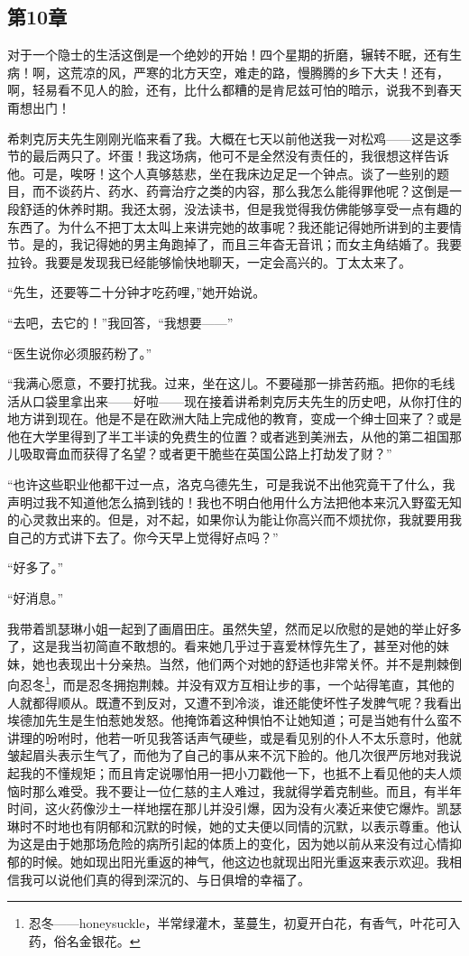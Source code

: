 \subsection{第10章}

\par 对于一个隐士的生活这倒是一个绝妙的开始！四个星期的折磨，辗转不眠，还有生病！啊，这荒凉的风，严寒的北方天空，难走的路，慢腾腾的乡下大夫！还有，啊，轻易看不见人的脸，还有，比什么都糟的是肯尼兹可怕的暗示，说我不到春天甭想出门！
\par 希刺克厉夫先生刚刚光临来看了我。大概在七天以前他送我一对松鸡——这是这季节的最后两只了。坏蛋！我这场病，他可不是全然没有责任的，我很想这样告诉他。可是，唉呀！这个人真够慈悲，坐在我床边足足一个钟点。谈了一些别的题目，而不谈药片、药水、药膏治疗之类的内容，那么我怎么能得罪他呢？这倒是一段舒适的休养时期。我还太弱，没法读书，但是我觉得我仿佛能够享受一点有趣的东西了。为什么不把丁太太叫上来讲完她的故事呢？我还能记得她所讲到的主要情节。是的，我记得她的男主角跑掉了，而且三年杳无音讯；而女主角结婚了。我要拉铃。我要是发现我已经能够愉快地聊天，一定会高兴的。丁太太来了。
\par “先生，还要等二十分钟才吃药哩，”她开始说。
\par “去吧，去它的！”我回答，“我想要——”
\par “医生说你必须服药粉了。”
\par “我满心愿意，不要打扰我。过来，坐在这儿。不要碰那一排苦药瓶。把你的毛线活从口袋里拿出来——好啦——现在接着讲希刺克厉夫先生的历史吧，从你打住的地方讲到现在。他是不是在欧洲大陆上完成他的教育，变成一个绅士回来了？或是他在大学里得到了半工半读的免费生的位置？或者逃到美洲去，从他的第二祖国那儿吸取膏血而获得了名望？或者更干脆些在英国公路上打劫发了财？”
\par “也许这些职业他都干过一点，洛克乌德先生，可是我说不出他究竟干了什么，我声明过我不知道他怎么搞到钱的！我也不明白他用什么方法把他本来沉入野蛮无知的心灵救出来的。但是，对不起，如果你认为能让你高兴而不烦扰你，我就要用我自己的方式讲下去了。你今天早上觉得好点吗？”
\par “好多了。”
\par “好消息。”
\par 我带着凯瑟琳小姐一起到了画眉田庄。虽然失望，然而足以欣慰的是她的举止好多了，这是我当初简直不敢想的。看来她几乎过于喜爱林惇先生了，甚至对他的妹妹，她也表现出十分亲热。当然，他们两个对她的舒适也非常关怀。并不是荆棘倒向忍冬\footnote{忍冬——honeysuckle，半常绿灌木，茎蔓生，初夏开白花，有香气，叶花可入药，俗名金银花。}，而是忍冬拥抱荆棘。并没有双方互相让步的事，一个站得笔直，其他的人就都得顺从。既遭不到反对，又遭不到冷淡，谁还能使坏性子发脾气呢？我看出埃德加先生是生怕惹她发怒。他掩饰着这种惧怕不让她知道；可是当她有什么蛮不讲理的吩咐时，他若一听见我答话声气硬些，或是看见别的仆人不太乐意时，他就皱起眉头表示生气了，而他为了自己的事从来不沉下脸的。他几次很严厉地对我说起我的不懂规矩；而且肯定说哪怕用一把小刀戳他一下，也抵不上看见他的夫人烦恼时那么难受。我不要让一位仁慈的主人难过，我就得学着克制些。而且，有半年时间，这火药像沙土一样地摆在那儿并没引爆，因为没有火凑近来使它爆炸。凯瑟琳时不时地也有阴郁和沉默的时候，她的丈夫便以同情的沉默，以表示尊重。他认为这是由于她那场危险的病所引起的体质上的变化，因为她以前从来没有过心情抑郁的时候。她如现出阳光重返的神气，他这边也就现出阳光重返来表示欢迎。我相信我可以说他们真的得到深沉的、与日俱增的幸福了。
